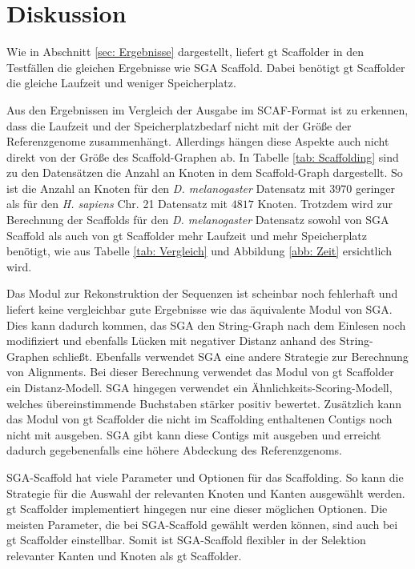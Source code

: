 \documentclass[a4paper,10pt,parskip]{scrartcl}
\begin{document}
\section{Diskussion}
\label{sec: Diskussion}

Wie in Abschnitt \ref{sec: Ergebnisse} dargestellt, liefert gt
Scaffolder in den Testfällen die gleichen Ergebnisse wie SGA
Scaffold. Dabei benötigt gt Scaffolder die gleiche Laufzeit und
weniger Speicherplatz.

Aus den Ergebnissen im Vergleich der Ausgabe im SCAF-Format ist zu
erkennen, dass die Laufzeit und der Speicherplatzbedarf nicht mit der
Größe der Referenzgenome zusammenhängt. Allerdings hängen diese
Aspekte auch nicht direkt von der Größe des Scaffold-Graphen ab. In
Tabelle \ref{tab: Scaffolding} sind zu den Datensätzen die Anzahl an
Knoten in dem Scaffold-Graph dargestellt. So ist die Anzahl an Knoten
für den \textit{D. melanogaster} Datensatz mit $3970$ geringer als für
den \textit{H. sapiens} Chr. 21 Datensatz mit $4817$ Knoten. Trotzdem
wird zur Berechnung der Scaffolds für den \textit{D. melanogaster}
Datensatz sowohl von SGA Scaffold als auch von gt Scaffolder mehr
Laufzeit und mehr Speicherplatz benötigt, wie aus Tabelle \ref{tab:
  Vergleich} und Abbildung \ref{abb: Zeit} ersichtlich wird.

Das Modul zur Rekonstruktion der Sequenzen ist scheinbar noch
fehlerhaft und liefert keine vergleichbar gute Ergebnisse wie das
äquivalente Modul von SGA. Dies kann dadurch kommen, das SGA den
String-Graph nach dem Einlesen noch modifiziert und ebenfalls Lücken
mit negativer Distanz anhand des String-Graphen schließt. Ebenfalls
verwendet SGA eine andere Strategie zur Berechnung von Alignments. Bei
dieser Berechnung verwendet das Modul von gt Scaffolder ein
Distanz-Modell. SGA hingegen verwendet ein
Ähnlichkeits-Scoring-Modell, welches übereinstimmende Buchstaben
stärker positiv bewertet. Zusätzlich kann das Modul von gt Scaffolder
die nicht im Scaffolding enthaltenen Contigs noch nicht mit
ausgeben. SGA gibt kann diese Contigs mit ausgeben und erreicht
dadurch gegebenenfalls eine höhere Abdeckung des Referenzgenoms.

SGA-Scaffold hat viele Parameter und Optionen für das Scaffolding. So
kann die Strategie für die Auswahl der relevanten Knoten und Kanten
ausgewählt werden. gt Scaffolder implementiert hingegen nur eine
dieser möglichen Optionen. Die meisten Parameter, die bei SGA-Scaffold
gewählt werden können, sind auch bei gt Scaffolder einstellbar. Somit
ist SGA-Scaffold flexibler in der Selektion relevanter Kanten und
Knoten als gt Scaffolder.
\end{document}
